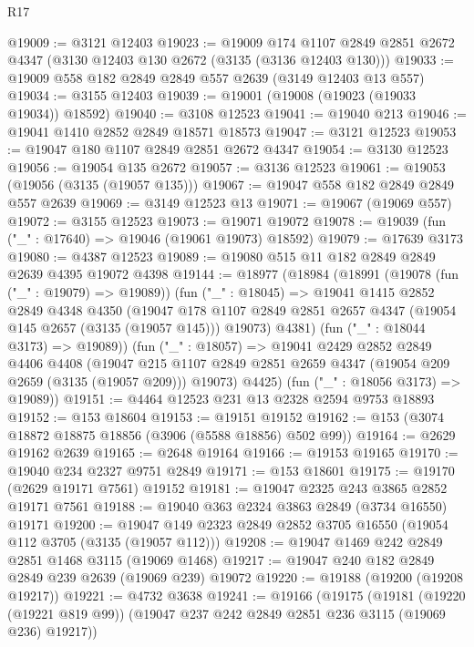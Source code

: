\begin{lexlean}{R17}
\begin{coremodule}
@19009 := @3121 @12403
@19023 := @19009
    @174
    @1107
    @2849
    @2851
    @2672
    @4347
    (@3130 @12403 @130 @2672 (@3135 (@3136 @12403 @130)))
@19033 := @19009 @558 @182 @2849 @2849 @557 @2639 (@3149 @12403 @13 @557)
@19034 := @3155 @12403
@19039 := @19001 (@19008 (@19023 (@19033 @19034)) @18592)
@19040 := @3108 @12523
@19041 := @19040 @213
@19046 := @19041 @1410 @2852 @2849 @18571 @18573
@19047 := @3121 @12523
@19053 := @19047 @180 @1107 @2849 @2851 @2672 @4347
@19054 := @3130 @12523
@19056 := @19054 @135 @2672
@19057 := @3136 @12523
@19061 := @19053 (@19056 (@3135 (@19057 @135)))
@19067 := @19047 @558 @182 @2849 @2849 @557 @2639
@19069 := @3149 @12523 @13
@19071 := @19067 (@19069 @557)
@19072 := @3155 @12523
@19073 := @19071 @19072
@19078 := @19039 (fun ("_" : @17640) => @19046 (@19061 @19073) @18592)
@19079 := @17639 @3173
@19080 := @4387 @12523
@19089 := @19080 @515 @11 @182 @2849 @2849 @2639 @4395 @19072 @4398
@19144 := @18977
    (@18984
      (@18991
        (@19078 (fun ("_" : @19079) => @19089))
        (fun ("_" : @18045) =>
        @19041
          @1415
          @2852
          @2849
          @4348
          @4350
          (@19047
            @178
            @1107
            @2849
            @2851
            @2657
            @4347
            (@19054 @145 @2657 (@3135 (@19057 @145)))
            @19073)
          @4381)
        (fun ("_" : @18044 @3173) => @19089))
      (fun ("_" : @18057) =>
      @19041
        @2429
        @2852
        @2849
        @4406
        @4408
        (@19047 @215 @1107 @2849 @2851 @2659 @4347 (@19054 @209 @2659 (@3135 (@19057 @209))) @19073)
        @4425)
      (fun ("_" : @18056 @3173) => @19089))
@19151 := @4464 @12523 @231 @13 @2328 @2594 @9753 @18893
@19152 := @153 @18604
@19153 := @19151 @19152
@19162 := @153 (@3074 @18872 @18875 @18856 (@3906 (@5588 @18856) @502 @99))
@19164 := @2629 @19162 @2639
@19165 := @2648 @19164
@19166 := @19153 @19165
@19170 := @19040 @234 @2327 @9751 @2849
@19171 := @153 @18601
@19175 := @19170 (@2629 @19171 @7561) @19152
@19181 := @19047 @2325 @243 @3865 @2852 @19171 @7561
@19188 := @19040 @363 @2324 @3863 @2849 (@3734 @16550) @19171
@19200 := @19047 @149 @2323 @2849 @2852 @3705 @16550 (@19054 @112 @3705 (@3135 (@19057 @112)))
@19208 := @19047 @1469 @242 @2849 @2851 @1468 @3115 (@19069 @1468)
@19217 := @19047 @240 @182 @2849 @2849 @239 @2639 (@19069 @239) @19072
@19220 := @19188 (@19200 (@19208 @19217))
@19221 := @4732 @3638
@19241 := @19166
    (@19175
      (@19181
        (@19220 (@19221 @819 @99))
        (@19047 @237 @242 @2849 @2851 @236 @3115 (@19069 @236) @19217))

\end{coremodule}
\end{lexlean}
